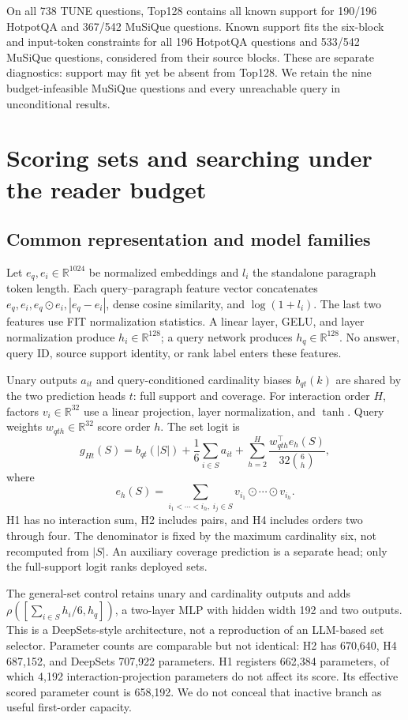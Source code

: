 \documentclass[pdflatex,sn-mathphys-num]{sn-jnl}
\begin{document}
On all 738 TUNE questions, Top128 contains all known support for 190/196
HotpotQA and 367/542 MuSiQue questions. Known support fits the six-block and
input-token constraints for all 196 HotpotQA questions and 533/542 MuSiQue
questions, considered from their source blocks. These are separate
diagnostics: support may fit yet be absent from Top128. We retain the nine
budget-infeasible MuSiQue questions and every unreachable query in
unconditional results.

\section{Scoring sets and searching under the reader budget}
\subsection{Common representation and model families}
Let $e_q,e_i\in\mathbb R^{1024}$ be normalized embeddings and $l_i$ the
standalone paragraph token length. Each query--paragraph feature vector
concatenates $e_q,e_i,e_q\odot e_i,|e_q-e_i|$, dense cosine similarity,
and $\log(1+l_i)$. The last two features use FIT normalization statistics.
A linear layer, GELU, and layer normalization produce $h_i\in\mathbb R^{128}$;
a query network produces $h_q\in\mathbb R^{128}$. No answer, query ID, source
support identity, or rank label enters these features.

Unary outputs $a_{it}$ and query-conditioned cardinality biases $b_{qt}(k)$
are shared by the two prediction heads $t$: full support and coverage.
For interaction order $H$, factors $v_i\in\mathbb R^{32}$ use a linear
projection, layer normalization, and $\tanh$. Query weights
$w_{qth}\in\mathbb R^{32}$ score order $h$. The set logit is
\begin{equation}\label{eq:hofm}
g_{Ht}(S)=b_{qt}(|S|)+\frac{1}{6}\sum_{i\in S}a_{it}
+\sum_{h=2}^{H}\frac{w_{qth}^{\top}e_h(S)}{32\binom6h},
\end{equation}
where
\begin{equation}
e_h(S)=\sum_{i_1<\cdots<i_h,\;i_j\in S}v_{i_1}\odot\cdots\odot v_{i_h}.
\end{equation}
H1 has no interaction sum, H2 includes pairs, and H4 includes orders two
through four. The denominator is fixed by the maximum cardinality six,
not recomputed from $|S|$. An auxiliary coverage prediction is a separate
head; only the full-support logit ranks deployed sets.

The general-set control retains unary and cardinality outputs and adds
$\rho([\sum_{i\in S}h_i/6,h_q])$, a two-layer MLP with hidden width 192 and
two outputs. This is a DeepSets-style architecture, not a reproduction of
an LLM-based set selector. Parameter counts are comparable but not identical:
H2 has 670,640, H4 687,152, and DeepSets 707,922 parameters. H1 registers
662,384 parameters, of which 4,192 interaction-projection parameters do not
affect its score. Its effective scored parameter count is 658,192. We do
not conceal that inactive branch as useful first-order capacity.
\end{document}
